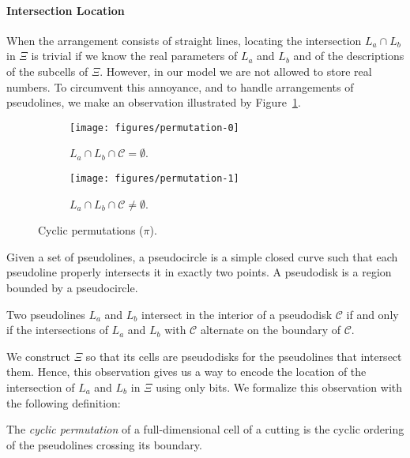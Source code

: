 \paragraph*{Intersection Location}
%
When the arrangement consists of straight lines,
locating the intersection \(L_a \cap L_b\) in \(\Xi\) is trivial if we
know the real parameters of \(L_a\) and \(L_b\) and of the descriptions
of the subcells of \(\Xi\). However, in our model we are not allowed to store
real numbers. To circumvent this annoyance, and to handle arrangements of
pseudolines, we make an observation illustrated by
Figure~\ref{fig:permutation}.
%
\begin{figure}
\centering{}
\begin{subfigure}[t]{0.5\textwidth}
\centering{}
\texttt{[image: figures/permutation-0]}
\caption{\(L_a \cap L_b \cap \mathcal{C} = \emptyset\).}
\end{subfigure}%
\begin{subfigure}[t]{0.5\textwidth}
\centering{}
\texttt{[image: figures/permutation-1]}
\caption{\(L_a \cap L_b \cap \mathcal{C} \neq \emptyset\).}
\end{subfigure}
\caption{Cyclic permutations (\(\pi\)).}\label{fig:permutation}
\end{figure}
%
\begin{definition}
    Given a set of pseudolines, a pseudocircle is a simple closed curve such that
    each pseudoline properly intersects it in exactly two points.
    A pseudodisk is a region bounded by a pseudocircle.
\end{definition}
%
\begin{observation}
    Two pseudolines \(L_a\) and \(L_b\)
    intersect in the interior of a pseudodisk \(\mathcal{C}\) if and only if
    the intersections of \(L_a\) and \(L_b\) with \(\mathcal{C}\)
    alternate on the boundary of \(\mathcal{C}\).
\end{observation}
%
%
We construct \(\Xi\) so that its cells are pseudodisks for the pseudolines that
intersect them.
%
Hence, this observation gives us a way to encode the location of the
intersection of \(L_a\) and \(L_b\) in \(\Xi\) using only bits.
%
We formalize this observation with the following definition:
\begin{definition}
  The \emph{cyclic permutation} of a full-dimensional cell of a cutting
  is the cyclic ordering of the pseudolines crossing its boundary.
\end{definition}
